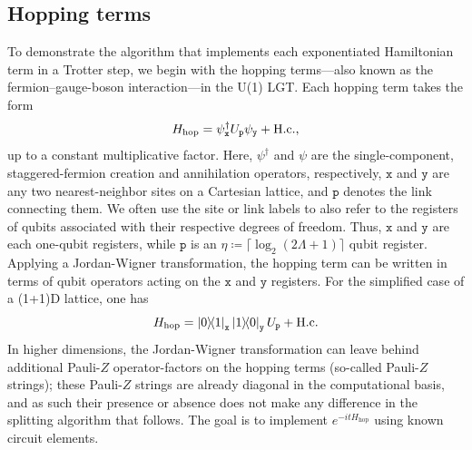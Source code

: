 \documentclass[aps,prd,twocolumn,showpacs,groupedaddress,superscriptaddress,nofootinbib,floatfix,preprintnumbers,longbibliography]{revtex4-1}
\begin{document}
\subsection{Hopping terms}
To demonstrate the algorithm that implements each exponentiated Hamiltonian term in a Trotter step, we begin with the hopping terms---also known as the fermion--gauge-boson interaction---in the U(1) LGT. Each hopping term takes the form
%
\begin{equation}
    H_{\mathrm{hop}} = \psi_{\mathtt{x}}^\dagger U_{\mathtt{p}} \psi_{\mathtt{y}} + {\rm H.c.},
    \label{eq:U(1)hopping-psi}
\end{equation}
%
up to a constant multiplicative factor. Here, $\psi^\dagger$ and $\psi$ are the single-component, staggered-fermion creation and annihilation operators, respectively, $\mathtt{x}$ and $\mathtt{y}$ are any two nearest-neighbor sites on a Cartesian lattice, and $\mathtt{p}$ denotes the link connecting them. We often use the site or link labels to also refer to the registers of qubits associated with their respective degrees of freedom. Thus, $\mathtt{x}$ and $\mathtt{y}$ are each one-qubit registers, while $\mathtt{p}$ is an $\eta \coloneq \lceil \log_2(2\Lambda+1)\rceil$ qubit register. Applying a Jordan-Wigner transformation, the hopping term can be written in terms of qubit operators acting on the $\mathtt{x}$ and $\mathtt{y}$ registers. For the simplified case of a (1+1)D lattice, one has
%
\begin{equation}
    H_{\mathrm{hop}} = \ket{0}\!\!\bra{1}_\mathtt{x} \ket{1}\!\!\bra{0}_\mathtt{y} U_\mathtt{p} + {\rm H.c.}
    \label{eq:U(1)hopping}
\end{equation}
%
In higher dimensions, the Jordan-Wigner transformation can leave behind additional Pauli-$Z$ operator-factors on the hopping terms (so-called Pauli-$Z$ strings); these Pauli-$Z$ strings are already diagonal in the computational basis, and as such their presence or absence does not make any difference in the splitting algorithm that follows. The goal is to implement $e^{-itH_\text{hop}}$ using known circuit elements. 
\end{document}
